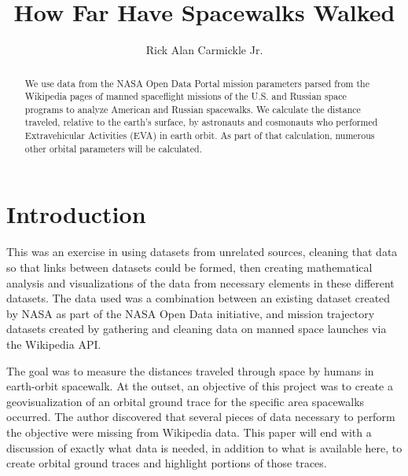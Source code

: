 \documentclass[sigconf]{acmart}
\begin{document}
\title{How Far Have Spacewalks Walked}

\author{Rick Alan Carmickle Jr.}


\renewcommand{\shortauthors}{R. Carmickle}


\begin{abstract}
We use data from the NASA Open Data Portal mission parameters parsed from the Wikipedia pages of manned spaceflight missions of the U.S. and Russian space programs to analyze American and Russian spacewalks. We calculate the distance traveled, relative to the earth's surface, by astronauts and cosmonauts who performed Extravehicular Activities (EVA) in earth orbit. As part of that calculation, numerous other orbital parameters will be calculated. 

\end{abstract}


\maketitle


\section{Introduction}
This was an exercise in using datasets from unrelated sources, cleaning that data so that links between datasets could be formed, then creating mathematical analysis and visualizations of the data from necessary elements in these different datasets. The data used was a combination between an existing dataset created by NASA as part of the NASA Open Data initiative, and mission trajectory datasets created by gathering and cleaning data on manned space launches via the Wikipedia API. 

The goal was to measure the distances traveled through space by humans in earth-orbit spacewalk. At the outset, an objective of this project was to create a geovisualization of an orbital ground trace for the specific area spacewalks occurred. The author discovered that several pieces of data necessary to perform the objective were missing from Wikipedia data. This paper will end with a discussion of exactly what data is needed, in addition to what is available here, to create orbital ground traces and highlight portions of those traces.
 
\end{document}
